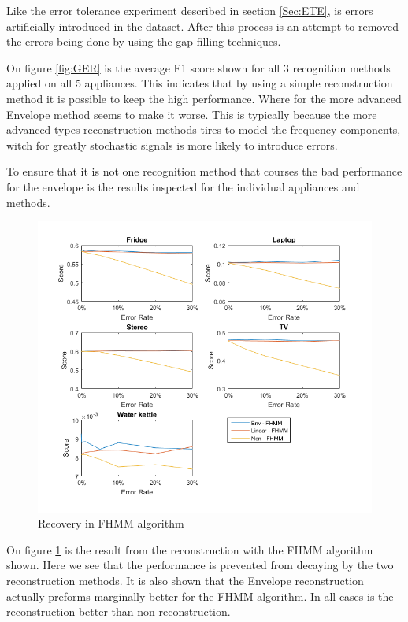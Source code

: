 Like the error tolerance experiment described in section \ref{Sec:ETE}, is errors artificially introduced in the dataset. After this process is an attempt to removed the errors being done by using the gap filling techniques. 

On figure \ref{fig:GER} is the average F1 score shown for all 3 recognition methods applied on all 5 appliances. This indicates that by using a simple reconstruction method it is possible to keep the high performance. Where for the more advanced Envelope method seems to make it worse. This is typically because the more advanced types reconstruction methods tires to model the frequency components, witch for greatly stochastic signals is more likely to introduce errors. 

To ensure that it is not one recognition method that courses the bad performance for the envelope is the results inspected for the individual appliances and methods. 


\newpage

\begin{figure}[H]
\centering
\includegraphics[width=1\textwidth]{billeder/Rec-FHMM.png}
\caption{Recovery in FHMM algorithm}
\label{fig:ERFHMM}
\end{figure}

On figure \ref{fig:ERFHMM} is the result from the reconstruction with the FHMM algorithm shown. Here we see that the performance is prevented from decaying by the two reconstruction methods. It is also shown that the Envelope reconstruction actually preforms marginally better for the FHMM algorithm. In all cases is the reconstruction better than non reconstruction. 

